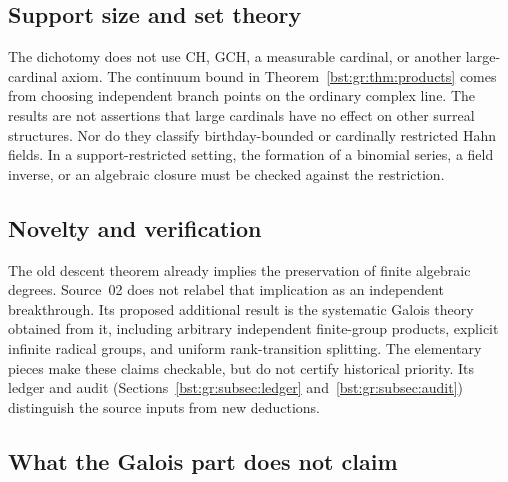 \documentclass[11pt,letterpaper]{article}
\theoremstyle{definition}
\theoremstyle{remark}
\begin{document}
\subsection{Support size and set theory}

The dichotomy does not use CH, GCH, a measurable cardinal, or another
large-cardinal axiom. The continuum bound in Theorem~\ref{bst:gr:thm:products}
comes from choosing independent branch points on the ordinary complex line.
The results are not assertions that large cardinals have no effect on other
surreal structures. Nor do they classify birthday-bounded or cardinally
restricted Hahn fields. In a support-restricted setting, the formation of a
binomial series, a field inverse, or an algebraic closure must be checked
against the restriction.

\subsection{Novelty and verification}

The old descent theorem already implies the preservation of finite algebraic
degrees. Source~02 does not relabel that implication as an independent
breakthrough. Its proposed additional result is the systematic Galois theory
obtained from it, including arbitrary independent finite-group products,
explicit infinite radical groups, and uniform rank-transition splitting. The
elementary pieces make these claims checkable, but do not certify historical
priority. Its ledger and audit (Sections~\ref{bst:gr:subsec:ledger}
and~\ref{bst:gr:subsec:audit}) distinguish the source inputs from new
deductions.

\subsection{What the Galois part does not claim}\label{bst:gr:subsec:nonclaims}
\end{document}
